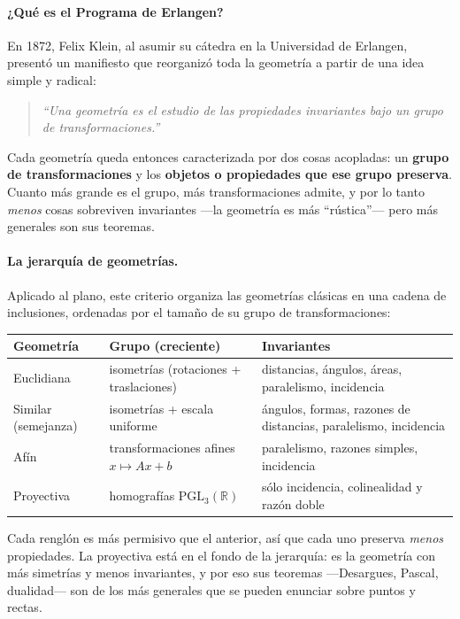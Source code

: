 \documentclass[11pt,a4paper]{article}
\newcommand{\R}{\mathbb{R}}
\begin{document}
\paragraph{¿Qué es el Programa de Erlangen?}
En 1872, Felix Klein, al asumir su cátedra en la Universidad de
Erlangen, presentó un manifiesto que reorganizó toda la geometría a
partir de una idea simple y radical:

\begin{quote}\itshape
``Una geometría es el estudio de las propiedades invariantes bajo un
grupo de transformaciones.''
\end{quote}

\noindent Cada geometría queda entonces caracterizada por dos cosas
acopladas: un \textbf{grupo de transformaciones} y los \textbf{objetos
o propiedades que ese grupo preserva}. Cuanto más grande es el grupo,
más transformaciones admite, y por lo tanto \emph{menos} cosas
sobreviven invariantes —la geometría es más ``rústica''— pero más
generales son sus teoremas.

\paragraph{La jerarquía de geometrías.}
Aplicado al plano, este criterio organiza las geometrías clásicas en
una cadena de inclusiones, ordenadas por el tamaño de su grupo de
transformaciones:

\begin{center}
\renewcommand{\arraystretch}{1.35}
\begin{tabularx}{\linewidth}{@{}l>{\raggedright\arraybackslash}X>{\raggedright\arraybackslash}X@{}}
\toprule
\textbf{Geometría} & \textbf{Grupo (creciente)} & \textbf{Invariantes} \\
\midrule
Euclidiana & isometrías (rotaciones + traslaciones) & distancias, ángulos, áreas, paralelismo, incidencia \\
Similar (semejanza) & isometrías + escala uniforme & ángulos, formas, razones de distancias, paralelismo, incidencia \\
Afín & transformaciones afines $x\mapsto Ax+b$ & paralelismo, razones simples, incidencia \\
Proyectiva & homografías $\mathrm{PGL}_3(\R)$ & sólo incidencia, colinealidad y razón doble \\
\bottomrule
\end{tabularx}
\end{center}

\noindent Cada renglón es más permisivo que el anterior, así que cada
uno preserva \emph{menos} propiedades. La proyectiva está en el fondo
de la jerarquía: es la geometría con más simetrías y menos
invariantes, y por eso sus teoremas —Desargues, Pascal, dualidad— son
de los más generales que se pueden enunciar sobre puntos y rectas.
\end{document}
